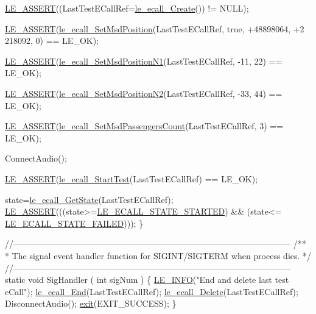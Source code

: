 \begin{DoxyCodeInclude}
{{{{{    \hyperlink{le__log_8h_ac0dbbef91dc0fed449d0092ff0557b39}{LE\_ASSERT}((LastTestECallRef=\hyperlink{le__ecall__interface_8h_aad7fa3b34d9d72a2f1d4baa681ba25cc}{le\_ecall\_Create}()) != NULL);

    \hyperlink{le__log_8h_ac0dbbef91dc0fed449d0092ff0557b39}{LE\_ASSERT}(\hyperlink{le__ecall__interface_8h_a2b56b7b7fd7f936c144d30eba7815908}{le\_ecall\_SetMsdPosition}(LastTestECallRef, \textcolor{keyword}{true}, +48898064, +2
      218092, 0) == LE\_OK);

    \hyperlink{le__log_8h_ac0dbbef91dc0fed449d0092ff0557b39}{LE\_ASSERT}(\hyperlink{le__ecall__interface_8h_af3cfea09eea1b1ba39648798070ad139}{le\_ecall\_SetMsdPositionN1}(LastTestECallRef, -11, 22) == 
      LE\_OK);

    \hyperlink{le__log_8h_ac0dbbef91dc0fed449d0092ff0557b39}{LE\_ASSERT}(\hyperlink{le__ecall__interface_8h_a6b25b9b242ba114f31ae2f853070bf11}{le\_ecall\_SetMsdPositionN2}(LastTestECallRef, -33, 44) == 
      LE\_OK);

    \hyperlink{le__log_8h_ac0dbbef91dc0fed449d0092ff0557b39}{LE\_ASSERT}(\hyperlink{le__ecall__interface_8h_a8c009bb03d61dcd0ffbd9e986b692a85}{le\_ecall\_SetMsdPassengersCount}(LastTestECallRef, 3) ==
       LE\_OK);

    ConnectAudio();

    \hyperlink{le__log_8h_ac0dbbef91dc0fed449d0092ff0557b39}{LE\_ASSERT}(\hyperlink{le__ecall__interface_8h_aa5d23a1bea370b1ae29fc52d7a89d947}{le\_ecall\_StartTest}(LastTestECallRef) == LE\_OK);

    state=\hyperlink{le__ecall__interface_8h_a7881e794b9249222edde10f76d7663c9}{le\_ecall\_GetState}(LastTestECallRef);
    \hyperlink{le__log_8h_ac0dbbef91dc0fed449d0092ff0557b39}{LE\_ASSERT}(((state>=\hyperlink{le__ecall__interface_8h_a233609e4724e549a1405f9177c0a07dda94ba7aacca9dfe74c4733515a7ba2c5e}{LE\_ECALL\_STATE\_STARTED}) && (state<=
      \hyperlink{le__ecall__interface_8h_a233609e4724e549a1405f9177c0a07dda5275385371c51e441a9eb97626c271b4}{LE\_ECALL\_STATE\_FAILED})));
\}

\textcolor{comment}{//--------------------------------------------------------------------------------------------------}\textcolor{comment}{}
\textcolor{comment}{/**}
\textcolor{comment}{ * The signal event handler function for SIGINT/SIGTERM when process dies.}
\textcolor{comment}{ */}
\textcolor{comment}{//--------------------------------------------------------------------------------------------------}
\textcolor{keyword}{static} \textcolor{keywordtype}{void} SigHandler
(
    \textcolor{keywordtype}{int} sigNum
)
\{
    \hyperlink{le__log_8h_a23e6d206faa64f612045d688cdde5808}{LE\_INFO}(\textcolor{stringliteral}{"End and delete last test eCall"});
    \hyperlink{le__ecall__interface_8h_a85800c86f9709fb7baa7219cc762181c}{le\_ecall\_End}(LastTestECallRef);
    \hyperlink{le__ecall__interface_8h_af1221deb68c46912748f65505b3e4919}{le\_ecall\_Delete}(LastTestECallRef);
    DisconnectAudio();
    \hyperlink{app_stop_client_8c_a310220604a584e112ba8f7aa3dfe23f1}{exit}(EXIT\_SUCCESS);
\}

}}}}}
\end{DoxyCodeInclude}
